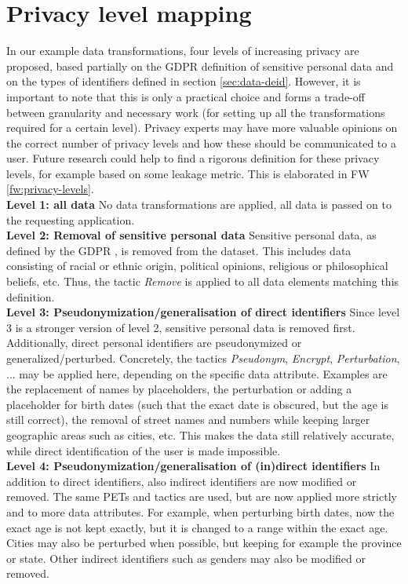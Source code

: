 \section{Privacy level mapping}
\label{appendix:privacy-levels}
In our example data transformations, four levels of increasing privacy are proposed, based partially on the \gls{GDPR} definition of sensitive personal data and on the types of identifiers defined in section \ref{sec:data-deid}. However, it is important to note that this is only a practical choice and forms a trade-off between granularity and necessary work (for setting up all the transformations required for a certain level). Privacy experts may have more valuable opinions on the correct number of privacy levels and how these should be communicated to a user. Future research could help to find a rigorous definition for these privacy levels, for example based on some leakage metric. This is elaborated in FW \ref{fw:privacy-levels}.\\

\noindent \textbf{Level 1: all data} No data transformations are applied, all data is passed on to the requesting application.\\

\noindent \textbf{Level 2: Removal of sensitive personal data} Sensitive personal data, as defined by the GDPR \citep{GDPR}, is removed from the dataset. This includes data consisting of racial or ethnic origin, political opinions, religious or philosophical beliefs, etc. Thus, the tactic \textit{Remove} is applied to all data elements matching this definition.\\

\noindent \textbf{Level 3: Pseudonymization/generalisation of direct identifiers} Since level 3 is a stronger version of level 2, sensitive personal data is removed first. Additionally, direct personal identifiers are pseudonymized or generalized/perturbed. Concretely, the tactics \textit{Pseudonym}, \textit{Encrypt}, \textit{Perturbation}, ... may be applied here, depending on the specific data attribute. Examples are the replacement of names by placeholders, the perturbation or adding a placeholder for birth dates (such that the exact date is obscured, but the age is still correct), the removal of street names and numbers while keeping larger geographic areas such as cities, etc. This makes the data still relatively accurate, while direct identification of the user is made impossible.\\

\noindent \textbf{Level 4: Pseudonymization/generalisation of (in)direct identifiers} In addition to direct identifiers, also indirect identifiers are now modified or removed. The same \gls{PETs} and tactics are used, but are now applied more strictly and to more data attributes. For example, when perturbing birth dates, now the exact age is not kept exactly, but it is changed to a range within the exact age. Cities may also be perturbed when possible, but keeping for example the province or state. Other indirect identifiers such as genders may also be modified or removed.
